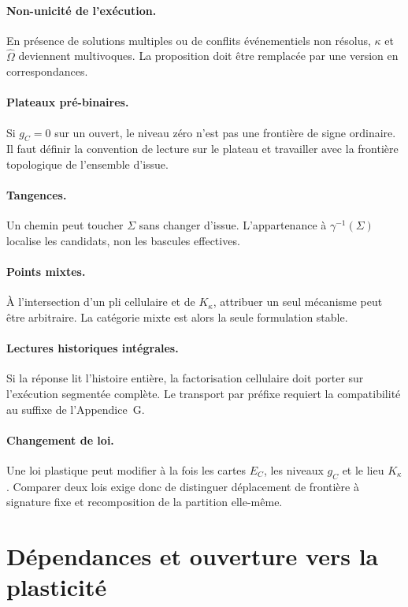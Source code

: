 \paragraph{Non-unicité de l'exécution.}
En présence de solutions multiples ou de conflits événementiels non
résolus, $\kappa$ et $\widehat\Omega$ deviennent multivoques. La
proposition doit être remplacée par une version en correspondances.

\paragraph{Plateaux pré-binaires.}
Si $g_C=0$ sur un ouvert, le niveau zéro n'est pas une frontière de signe
ordinaire. Il faut définir la convention de lecture sur le plateau et
travailler avec la frontière topologique de l'ensemble d'issue.

\paragraph{Tangences.}
Un chemin peut toucher $\Sigma$ sans changer d'issue. L'appartenance à
$\gamma^{-1}(\Sigma)$ localise les candidats, non les bascules effectives.

\paragraph{Points mixtes.}
À l'intersection d'un pli cellulaire et de $K_\kappa$, attribuer un seul
mécanisme peut être arbitraire. La catégorie mixte est alors la seule
formulation stable.

\paragraph{Lectures historiques intégrales.}
Si la réponse lit l'histoire entière, la factorisation cellulaire doit
porter sur l'exécution segmentée complète. Le transport par préfixe
requiert la compatibilité au suffixe de l'Appendice~G.

\paragraph{Changement de loi.}
Une loi plastique peut modifier à la fois les cartes $E_C$, les niveaux
$g_C$ et le lieu $K_\kappa$. Comparer deux lois exige donc de distinguer
déplacement de frontière à signature fixe et recomposition de la
partition elle-même.

\section{Dépendances et ouverture vers la plasticité}
\label{annexe-J-dependances}

